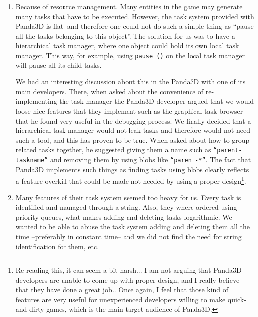 \documentclass[a4paper,10pt]{article}
\begin{document}
\begin{enumerate}
\item Because of resource management. Many entities in the game may
  generate many tasks that have to be executed. However, the task
  system provided with Panda3D is flat, and therefore one could not do
  such a simple thing as ``pause all the tasks belonging to this
  object''. The solution for us was to have a hierarchical task
  manager, where one object could hold its own local task
  manager. This way, for example, using \texttt{pause ()} on the local
  task manager will pause all its child tasks.

  We had an interesting discussion about this in the Panda3D with one
  of its main developers\cite{pandataskforum}. There, when asked about the
  convenience of re-implementing the task manager the Panda3D
  developer argued that we would loose nice features that they
  implement such as the graphical task browser that he found very
  useful in the debugging process. We finally decided that a
  hierarchical task manager would not leak tasks and therefore would
  not need such a tool, and this has proven to be true. When asked
  about how to group related tasks together, he suggested giving them
  a name such as \texttt{``parent-taskname''} and removing them by
  using blobs like \texttt{``parent-*''}. The fact that Panda3D
  implements such things as finding tasks using blobs clearly reflects
  a feature overkill that could be made not needed by using a proper
  design\footnote{Re-reading this, it can seem a bit harsh... I am not
    arguing that Panda3D developers are unable to come up with proper
    design, and I really believe that they have done a great
    job.. Once again, I feel that those kind of features are very
    useful for unexperienced developers willing to make
    quick-and-dirty games, which is the main target audience of
    Panda3D.}.

\item Many features of their task system seemed too heavy for us. Every
  task is identified and managed through a string. Also, they where
  ordered using priority queues, what makes adding and deleting tasks
  logarithmic. We wanted to be able to abuse the task system adding
  and deleting them all the time --preferably in constant time-- and
  we did not find the need for string identification for them, etc.
\end{enumerate}
\end{document}
